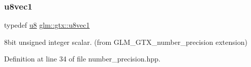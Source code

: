 \subsubsection{\texorpdfstring{u8vec1}{u8vec1}}
{\footnotesize\ttfamily typedef \mbox{\hyperlink{group__gtc__type__precision_ga5e3dc67373d5068997d2d9f41c9024d2}{u8}} \mbox{\hyperlink{group__gtx__number__precision_ga35ae7849593a354420e4f52d1b36c2d6}{glm\+::gtx\+::u8vec1}}}



8bit unsigned integer scalar. (from G\+L\+M\+\_\+\+G\+T\+X\+\_\+number\+\_\+precision extension) 



Definition at line 34 of file number\+\_\+precision.\+hpp.

